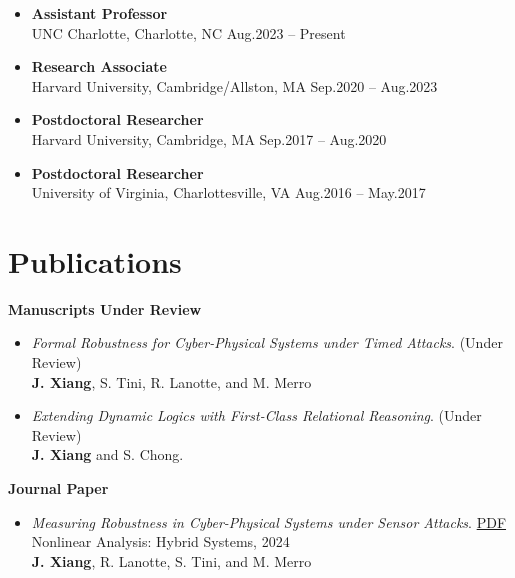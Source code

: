 \documentclass[11pt]{article}
\begin{document}
\begin{itemize}
  \item \textbf{Assistant Professor} \\
UNC Charlotte, Charlotte, NC \hfill Aug.2023 – Present
    \item \textbf{Research Associate} \\
Harvard University, Cambridge/Allston, MA \hfill Sep.2020 – Aug.2023
    \item \textbf{Postdoctoral Researcher} \\
Harvard University, Cambridge, MA \hfill Sep.2017 – Aug.2020
    \item \textbf{Postdoctoral Researcher}	\\
University of Virginia, Charlottesville, VA \hfill  Aug.2016 – May.2017
\end{itemize}





\section{Publications}


\textbf{Manuscripts Under Review}

\begin{itemize}
\item \textit{Formal Robustness for Cyber-Physical Systems under Timed
Attacks}. (Under Review) \\
\textbf{J. Xiang}, S. Tini, R. Lanotte, and M. Merro
%
\item \textit{Extending Dynamic Logics with First-Class Relational Reasoning}. (Under Review) \\
\textbf{J. Xiang} and S. Chong. 

\end{itemize}

\textbf{Journal Paper}

\begin{itemize}

  \item \textit{Measuring Robustness in Cyber-Physical Systems under Sensor Attacks}.
  \href{https://arxiv.org/pdf/2403.05829}{PDF} \\
  Nonlinear Analysis: Hybrid Systems, 2024 \\
  \textbf{J. Xiang}, R. Lanotte, S. Tini, and M. Merro
\end{itemize}
\end{document}
